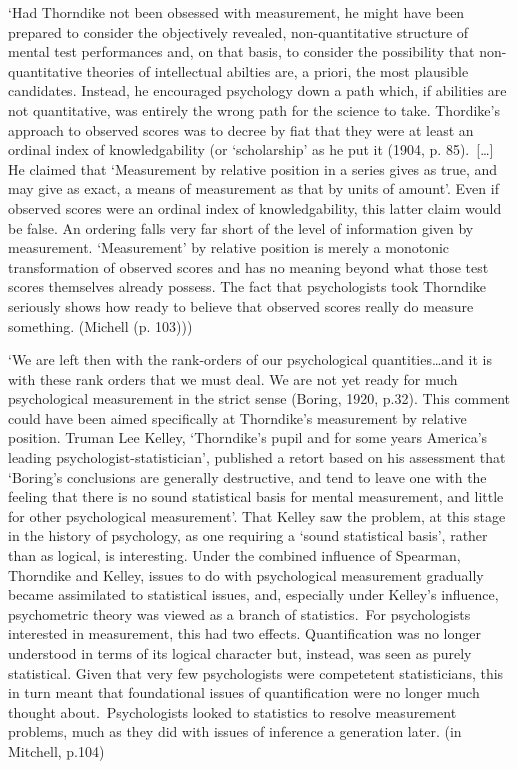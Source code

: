 \documentclass[utf8]{FrontiersinVancouver}
\begin{document}
    `Had Thorndike not been obsessed with measurement, he might have been prepared to consider the objectively revealed, non-quantitative structure of mental test performances and, on that basis, to consider the possibility that non-quantitative theories of intellectual abilties are, a priori, the most plausible candidates. Instead, he encouraged psychology down a path which, if abilities are not quantitative, was entirely the wrong path for the science to take. Thordike's approach to observed scores was to decree by fiat that they were at least an ordinal index of knowledgability (or `scholarship' as he put it (1904, p. 85).\ [\ldots] He claimed that `Measurement by relative position in a series gives as true, and may give as exact, a means of measurement as that by units of amount'. Even if observed scores were an ordinal index of knowledgability, this latter claim would be false. An ordering falls very far short of the level of information given by measurement. `Measurement' by relative position is merely a monotonic transformation of observed scores and has no meaning beyond what those test scores themselves already possess. The fact that psychologists took Thorndike seriously shows how ready to believe that observed scores really do measure something. (Michell (p. 103)))

    `We are left then with the rank-orders of our psychological quantities\ldots and it is with these rank orders that we must deal. We are not yet ready for much psychological measurement in the strict sense (Boring, 1920, p.32). This comment could have been aimed specifically at Thorndike's measurement by relative position. Truman Lee Kelley, `Thorndike's pupil and for some years America's leading psychologist-statistician', published a retort based on his assessment that `Boring's conclusions are generally destructive, and tend to leave one with the feeling that there is no sound statistical basis for mental measurement, and little for other psychological measurement'. That Kelley saw the problem, at this stage in the history of psychology, as one requiring a `sound statistical basis', rather than as logical, is interesting. Under the combined influence of Spearman, Thorndike and Kelley, issues to do with psychological measurement gradually became assimilated to statistical issues, and, especially under Kelley's influence, psychometric theory was viewed as a branch of statistics.\ For psychologists interested in measurement, this had two effects. Quantification was no longer understood in terms of its logical character but, instead, was seen as purely statistical. Given that very few psychologists were competetent statisticians, this in turn meant that foundational issues of quantification were no longer much thought about.\ Psychologists looked to statistics to resolve measurement problems, much as they did with issues of inference a generation later. (in Mitchell, p.104)
\end{document}
